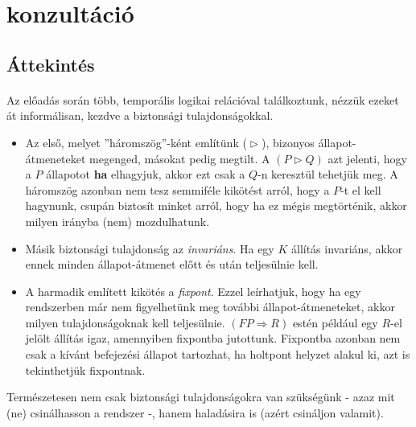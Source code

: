 \documentclass[12pt]{article}
\begin{document}
	\tableofcontents
	\newpage
	
	\section{konzultáció}
		\subsection{Áttekintés}
		\paragraph{}
		Az előadás során több, temporális logikai relációval találkoztunk, nézzük ezeket át informálisan, kezdve a biztonsági tulajdonságokkal.
		
	\begin{itemize}
		\item 
		Az első, melyet ''háromszög''-ként említünk ($ \vartriangleright $), bizonyos állapot-átmeneteket megenged, másokat pedig megtilt. A $(P \vartriangleright Q)$ azt jelenti, hogy a $P$ állapotot \textbf{ha} elhagyjuk, akkor ezt csak a $Q$-n keresztül tehetjük meg. A háromszög azonban nem tesz semmiféle kikötést arról, hogy a $P$-t el kell hagynunk, csupán biztosít minket arról, hogy ha ez mégis megtörténik, akkor milyen irányba (nem) mozdulhatunk.
		
		\item Másik biztonsági tulajdonság az \textit{invariáns}. Ha egy $K$ állítás invariáns, akkor ennek minden állapot-átmenet előtt és után teljesülnie kell.
		
		\item A harmadik említett kikötés a \textit{fixpont}. Ezzel leírhatjuk, hogy ha egy rendszerben már nem figyelhetünk meg további állapot-átmeneteket, akkor milyen tulajdonságoknak kell teljesülnie. $(FP \Rightarrow R)$ estén például egy $R$-el jelölt állítás igaz, amennyiben fixpontba jutottunk. Fixpontba azonban nem csak a kívánt befejezési állapot tartozhat, ha holtpont helyzet alakul ki, azt is tekinthetjük fixpontnak.
	\end{itemize}
	Természetesen nem csak biztonsági tulajdonságokra van szükségünk - azaz mit (ne) csinálhasson a rendszer -, hanem haladásira is (azért csináljon valamit).
	
\end{document}
